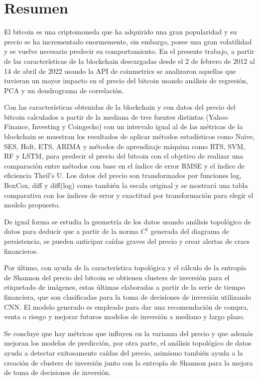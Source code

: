 \chapter*{Resumen}

El bitcoin es una criptomoneda que ha adquirido una gran popularidad y su precio se ha incrementado enormemente, sin embargo, posee una gran volatilidad y se vuelve necesario predecir su comportamiento. En el presente trabajo, a partir de las características de la blockchain descargadas desde el 2 de febrero de 2012 al 14 de abril de 2022 usando la API de coinmetrics se analizaron aquellas que tuvieran un mayor impacto en el precio del bitcoin usando análisis de regresión, PCA y un dendrograma de correlación.

Con las características obtenidas de la blockchain y con datos del precio del bitcoin calculados a partir de la mediana de tres fuentes distintas (Yahoo Finance, Investing y Coingecko) con un intervalo igual al de las métricas de la blockchain se muestran los resultados de aplicar métodos estadísticos como Naive, SES, Holt, ETS, ARIMA y métodos de aprendizaje máquina como RTS, SVM, RF y LSTM, para predecir el precio del bitcoin con el objetivo de realizar una comparación entre métodos con base en el índice de error RMSE y el índice de eficiencia Theil’s U. Los datos del precio son transformados por funciones log, BoxCox, diff y diff(log) como también la escala original y se mostrará una tabla comparativa con los índices de error y exactitud por transformación para elegir el modelo propuesto.

De igual forma se estudia la geometría de los datos usando análisis topológico de datos para deducir que a partir de la norma $C^1$ generada del diagrama de persistencia, se pueden anticipar caídas graves del precio y crear alertas de cracs financieros.

Por último, con ayuda de la característica topológica y el cálculo de la entropía de Shannon del precio del bitcoin se obtienen clusters de inversión para el etiquetado de imágenes, estas últimas elaboradas a partir de la serie de tiempo financiera, que son clasificadas para la toma de decisiones de inversión utilizando CNN. El modelo generado es empleado para dar una recomendación de compra, venta o riesgo y mejorar futuros modelos de inversión a mediano y largo plazo.

Se concluye que hay métricas que influyen en la varianza del precio y que además mejoran los modelos de predicción, por otra parte, el análisis topológico de datos ayuda a detectar exitosamente caídas del precio, asimismo también ayuda a la creación de clusters de inversión junto con la entropía de Shannon para la mejora de toma de decisiones de inversión.

